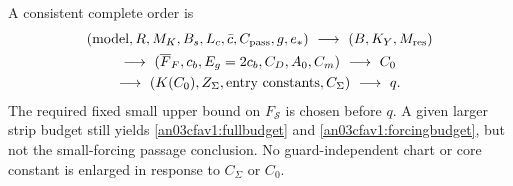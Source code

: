 \documentclass[11pt]{article}
\theoremstyle{remark}\newtheorem{remark}[theorem]{Remark}
\begin{document}
A consistent complete order is
\begin{equation}
 \begin{gathered}
 (\text{model},R,M_K,B_s,L_c,\bar c,C_{\rm pass},g,e_*)
 \ \longrightarrow\ (B,K_Y,M_{\rm res})\\
 \longrightarrow\ (\overline F_F,c_b,E_g=2c_b,C_D,A_0,C_m)
 \ \longrightarrow\ C_0\\
 \longrightarrow\ (K(C_0),Z_\Sigma,\text{entry constants},C_\Sigma)
 \ \longrightarrow\ q .
 \end{gathered}
 \label{an03cfav1:order}
\end{equation}
The required fixed small upper bound on $F_{\mathcal S}$ is
chosen before $q$. A given larger strip budget still yields
\eqref{an03cfav1:fullbudget} and
\eqref{an03cfav1:forcingbudget}, but not the small-forcing
passage conclusion. No guard-independent chart or core
constant is enlarged in response to $C_\Sigma$ or $C_0$.
\end{document}
